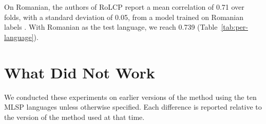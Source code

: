 On Romanian, the authors of RoLCP report a mean correlation of 0.71 over folds, with a standard %
deviation of 0.05, from a model trained on Romanian labels \citep{anghel-etal-2025-rals}. With Romanian as the
test language, we reach 0.739 (Table~\ref{tab:per-language}). %

\section{What Did Not Work}
\label{sec:negative}

We conducted these experiments on earlier versions of the method using the ten MLSP languages unless
otherwise specified. Each difference is reported relative to the version of the method used at that
time.

